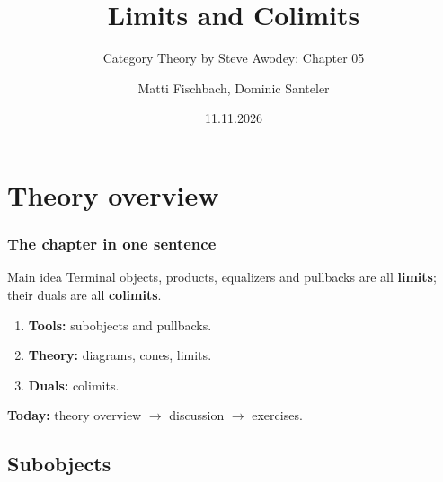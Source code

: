 \documentclass[11pt,t,usepdftitle=false,aspectratio=169]{beamer}
\title[Category Theory: Chapter 05]{Limits and Colimits}
\subtitle{Category Theory by Steve Awodey: Chapter 05}
\author[Matti Fischbach \& Dominic Santeler]{Matti Fischbach, Dominic Santeler}
\date{11.11.2026}
\begin{document}
\maketitle

\section{Theory overview}

\begin{frame}
\frametitle{The chapter in one sentence}

  \begin{block}{Main idea}
    Terminal objects, products, equalizers and pullbacks are all
    \textbf{limits}; their duals are all \textbf{colimits}.
  \end{block}

  \medskip

  \begin{enumerate}
    \item \textbf{Tools:} subobjects and pullbacks.
    \item \textbf{Theory:} diagrams, cones, limits.
    \item \textbf{Duals:} colimits.
  \end{enumerate}

  \medskip

  \textbf{Today:} theory overview $\to$ discussion $\to$ exercises.

\end{frame}

\subsection{Subobjects}
\end{document}
